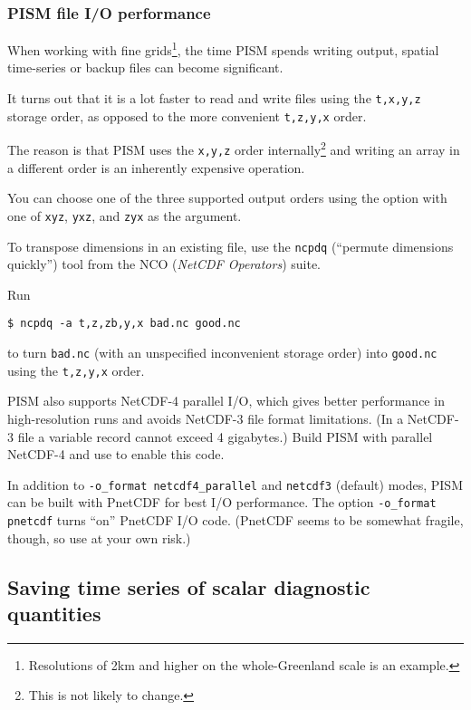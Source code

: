 \subsubsection{PISM file I/O performance}
\label{sec:pism-io-performance}

When working with fine grids\footnote{Resolutions of 2km and higher on the
  whole-Greenland scale is an example.}, the time PISM spends writing output,
spatial time-series or backup files can become significant.

It turns out that it is a lot faster to read and write files using the
\texttt{t,x,y,z} storage order, as opposed to the more convenient
\texttt{t,z,y,x} order.

The reason is that PISM uses the \texttt{x,y,z} order internally\footnote{This
  is not likely to change.} and writing an array in a different order is an
inherently expensive operation.

You can choose one of the three supported output orders using the
 option with one of \texttt{xyz}, \texttt{yxz}, and
\texttt{zyx} as the argument.

To transpose dimensions in an existing file, use the \texttt{ncpdq} (``permute
dimensions quickly'') tool from the NCO (\emph{NetCDF Operators}) suite.

Run
\begin{verbatim}
$ ncpdq -a t,z,zb,y,x bad.nc good.nc
\end{verbatim}%
to turn \texttt{bad.nc} (with an unspecified inconvenient storage order) into
\texttt{good.nc} using the \texttt{t,z,y,x} order.

PISM also supports NetCDF-4 parallel I/O, which gives better performance in
high-resolution runs and avoids NetCDF-3 file format limitations. (In a
NetCDF-3 file a variable record cannot exceed 4 gigabytes.) Build PISM with
parallel NetCDF-4 and use  to
enable this code.

In addition to \texttt{-o_format netcdf4_parallel} and \texttt{netcdf3}
(default) modes, PISM can be built with PnetCDF for best I/O performance. The
option \texttt{-o_format pnetcdf} turns ``on'' PnetCDF I/O code. (PnetCDF seems
to be somewhat fragile, though, so use at your own risk.)

\subsection{Saving time series of scalar diagnostic quantities}
\label{sec:saving-time-series}


